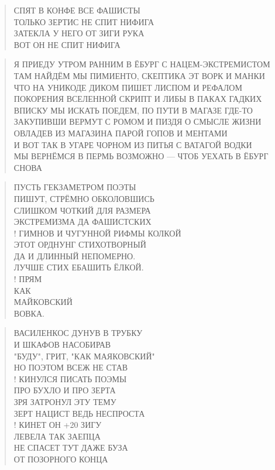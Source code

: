\poemtitle{***}
\begin{verse}
СПЯТ В КОНФЕ ВСЕ ФАШИСТЫ\\
ТОЛЬКО ЗЕРТИС НЕ СПИТ НИФИГА\\
ЗАТЕКЛА У НЕГО ОТ ЗИГИ РУКА\\
ВОТ ОН НЕ СПИТ НИФИГА
\end{verse}

\poemtitle{***}
\begin{verse}
Я ПРИЕДУ УТРОМ РАННИМ В ЁБУРГ С НАЦЕМ-ЭКСТРЕМИСТОМ\\
ТАМ НАЙДЁМ МЫ ПИМИЕНТО, СКЕПТИКА ЭТ ВОРК И МАНКИ\\
ЧТО НА УНИКОДЕ ДИКОМ ПИШЕТ ЛИСПОМ И РЕФАЛОМ\\
ПОКОРЕНИЯ ВСЕЛЕННОЙ СКРИПТ И ЛИБЫ В ПАКАХ ГАДКИХ\\
ВПИСКУ МЫ ИСКАТЬ ПОЕДЕМ, ПО ПУТИ В МАГАЗЕ ГДЕ-ТО\\
ЗАКУПИВШИ ВЕРМУТ С РОМОМ И ПИЗДЯ О СМЫСЛЕ ЖИЗНИ\\
ОВЛАДЕВ ИЗ МАГАЗИНА ПАРОЙ ГОПОВ И МЕНТАМИ\\
И ВОТ ТАК В УГАРЕ ЧОРНОМ ИЗ ПИТЬЯ С ВАТАГОЙ ВОДКИ\\
МЫ ВЕРНЁМСЯ В ПЕРМЬ ВОЗМОЖНО — ЧТОБ УЕХАТЬ В ЁБУРГ СНОВА
\end{verse}

\poemtitle{***}
\begin{verse}
ПУСТЬ ГЕКЗАМЕТРОМ ПОЭТЫ \\
ПИШУТ, СТРЁМНО ОБКОЛОВШИСЬ\\
СЛИШКОМ ЧОТКИЙ ДЛЯ РАЗМЕРА \\
ЭКСТРЕМИЗМА ДА ФАШИСТСКИХ\\!
ГИМНОВ И ЧУГУННОЙ РИФМЫ КОЛКОЙ \\
ЭТОТ ОРДНУНГ СТИХОТВОРНЫЙ\\
ДА И ДЛИННЫЙ НЕПОМЕРНО. \\
ЛУЧШЕ СТИХ ЕБАШИТЬ ЁЛКОЙ.\\!
ПРЯМ \\
        КАК \\
               МАЙКОВСКИЙ \\
        ВОВКА.
\end{verse}

\poemtitle{***}
\begin{verse}
ВАСИЛЕНКОС ДУНУВ В ТРУБКУ\\
И ШКАФОВ НАСОБИРАВ\\
"БУДУ", ГРИТ, "КАК МАЯКОВСКИЙ"\\
НО ПОЭТОМ ВСЕЖ НЕ СТАВ\\!
КИНУЛСЯ ПИСАТЬ ПОЭМЫ\\
ПРО БУХЛО И ПРО ЗЕРТА\\
ЗРЯ ЗАТРОНУЛ ЭТУ ТЕМУ\\
ЗЕРТ НАЦИСТ ВЕДЬ НЕСПРОСТА\\!
КИНЕТ ОН +20 ЗИГУ\\
ЛЕВЕЛА ТАК ЗАЕПЦА\\
НЕ СПАСЕТ ТУТ ДАЖЕ БУЗА\\
ОТ ПОЗОРНОГО КОНЦА
\end{verse}

